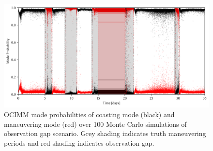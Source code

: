\documentclass[letterpaper, preprint, paper,11pt]{AAS}	%
\begin{document}
\begin{figure}
    \centering
    \includegraphics[width=1\linewidth]{Figures/mode_probabilities.png}
    \caption{OCIMM mode probabilities of coasting mode (black) and maneuvering mode (red) over 100 Monte Carlo simulations of observation gap scenario. Grey shading indicates truth maneuvering periods and red shading indicates observation gap. }
    \label{fig:mode-probabilities}
\end{figure}
\end{document}
